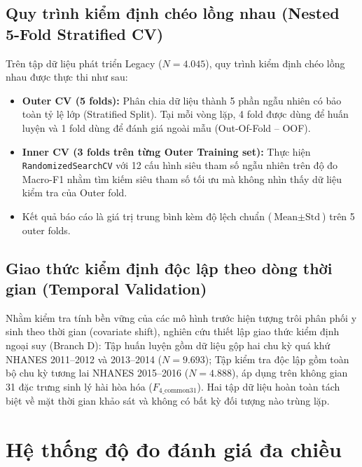 \subsection{Quy trình kiểm định chéo lồng nhau (Nested 5-Fold Stratified CV)}
\label{subsec:nested-cv-protocol}

Trên tập dữ liệu phát triển Legacy ($N = 4.045$), quy trình kiểm định chéo lồng nhau được thực thi như sau:
\begin{itemize}
    \item \textbf{Outer CV (5 folds):} Phân chia dữ liệu thành 5 phần ngẫu nhiên có bảo toàn tỷ lệ lớp (Stratified Split). Tại mỗi vòng lặp, 4 fold được dùng để huấn luyện và 1 fold dùng để đánh giá ngoài mẫu (Out-Of-Fold -- OOF).
    \item \textbf{Inner CV (3 folds trên từng Outer Training set):} Thực hiện \texttt{RandomizedSearchCV} với 12 cấu hình siêu tham số ngẫu nhiên trên độ đo Macro-F1 nhằm tìm kiếm siêu tham số tối ưu mà không nhìn thấy dữ liệu kiểm tra của Outer fold.
    \item Kết quả báo cáo là giá trị trung bình kèm độ lệch chuẩn ($\text{Mean} \pm \text{Std}$) trên 5 outer folds.
\end{itemize}

\subsection{Giao thức kiểm định độc lập theo dòng thời gian (Temporal Validation)}
\label{subsec:temporal-protocol}

Nhằm kiểm tra tính bền vững của các mô hình trước hiện tượng trôi phân phối y sinh theo thời gian (covariate shift), nghiên cứu thiết lập giao thức kiểm định ngoại suy (Branch D): Tập huấn luyện gồm dữ liệu gộp hai chu kỳ quá khứ NHANES 2011--2012 và 2013--2014 ($N = 9.693$); Tập kiểm tra độc lập gồm toàn bộ chu kỳ tương lai NHANES 2015--2016 ($N = 4.888$), áp dụng trên không gian 31 đặc trưng sinh lý hài hòa hóa ($F_{4\_\text{common31}}$). Hai tập dữ liệu hoàn toàn tách biệt về mặt thời gian khảo sát và không có bất kỳ đối tượng nào trùng lặp.

\section{Hệ thống độ đo đánh giá đa chiều}
\label{sec:he-thong-do-do}

